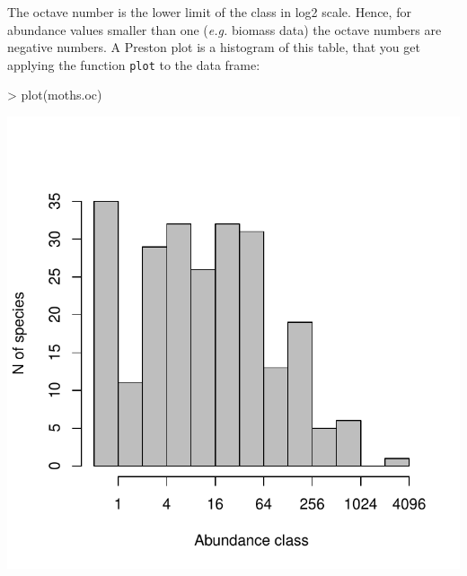 \documentclass[11pt, A4]{article}
\newcommand{\code}[1]{\texttt{#1}}
\begin{document}
The octave number is the lower limit of the class in log2 scale. 
Hence, for abundance values smaller than one (\emph{e.g.} biomass data) the octave numbers are negative numbers.
A Preston plot is a histogram of this table, that you get applying the function \code{plot} to the data frame:

\begin{Schunk}
\begin{Sinput}
> plot(moths.oc)
\end{Sinput}
\end{Schunk}
\includegraphics{sads_quick_reference-Ploting-octaves}
\end{document}
